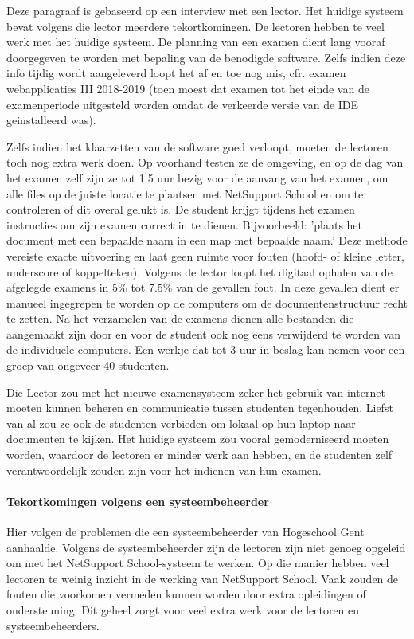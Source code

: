 Deze paragraaf is gebaseerd op een interview met een lector. Het huidige systeem bevat volgens die lector meerdere tekortkomingen. De lectoren hebben te veel werk met het huidige systeem. De planning van een examen dient lang vooraf doorgegeven te worden met bepaling van de benodigde software.  Zelfs indien deze info tijdig wordt aangeleverd loopt het af en toe nog mis, cfr. examen webapplicaties III 2018-2019 (toen moest dat examen tot het einde van de examenperiode uitgesteld worden omdat de verkeerde versie van de IDE geinstalleerd was).

Zelfs indien het klaarzetten van de software goed verloopt, moeten de lectoren toch nog extra werk doen. Op voorhand testen ze de omgeving, en op de dag van het examen zelf zijn ze tot 1.5 uur bezig voor de aanvang van het examen, om alle files op de juiste locatie te plaatsen met NetSupport School en om te controleren of dit overal gelukt is. De student krijgt tijdens het examen instructies om zijn examen correct in te dienen. Bijvoorbeeld: 'plaats het document met een bepaalde naam in een map met bepaalde naam.' Deze methode vereiste exacte uitvoering en laat geen ruimte voor fouten (hoofd- of kleine letter, underscore of koppelteken). Volgens de lector loopt het digitaal ophalen van de afgelegde examens in 5\% tot 7.5\% van de gevallen fout.
In deze gevallen dient er manueel ingegrepen te worden op de computers om de documentenstructuur recht te zetten. Na het verzamelen van de examens dienen alle bestanden die aangemaakt zijn door en voor de student ook nog eens verwijderd te worden van de individuele computers. Een werkje dat tot 3 uur in beslag kan nemen voor een groep van ongeveer 40 studenten.  

Die Lector zou met het nieuwe examensysteem zeker het gebruik van internet moeten kunnen beheren en communicatie tussen studenten tegenhouden. Liefst van al zou ze ook de studenten verbieden om lokaal op hun laptop naar documenten te kijken. Het huidige systeem zou vooral gemoderniseerd moeten worden, waardoor de lectoren er minder werk aan hebben, en de studenten zelf verantwoordelijk zouden zijn voor het indienen van hun examen. 


\paragraph{Tekortkomingen volgens een systeembeheerder}
Hier volgen de problemen die een systeembeheerder van Hogeschool Gent aanhaalde. Volgens de systeembeheerder zijn de lectoren zijn niet genoeg opgeleid om met het NetSupport School-systeem te werken. Op die manier hebben veel lectoren te weinig inzicht in de werking van NetSupport School. Vaak zouden de fouten die voorkomen vermeden kunnen worden door extra opleidingen of ondersteuning. Dit geheel zorgt voor veel extra werk voor de lectoren en systeembeheerders. 

